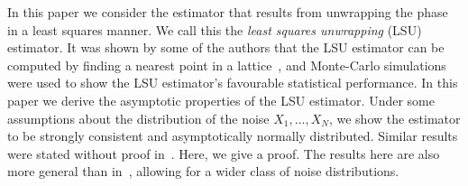 \documentclass[aap,preprint]{imsart}
\begin{document}
In this paper we consider the estimator that results from unwrapping the phase in a least squares manner.  We call this the \emph{least squares unwrapping} (LSU) estimator.  It was shown by some of the authors \cite[Sec. 8.1]{McKilliam2010thesis}\cite{McKilliam2009asilomar_polyest_lattice} that the LSU estimator can be computed by finding a nearest point in a lattice~\cite{Agrell2002}, and Monte-Carlo simulations were used to show the LSU estimator's favourable statistical performance. %
In this paper we derive the asymptotic properties of the LSU estimator.  Under some assumptions about the distribution of the noise $X_1, \dots, X_N$, we show the estimator to be strongly consistent and asymptotically normally distributed.  Similar results were stated without proof in~\cite{McKilliam_polyphase_est_icassp_2011}.  Here, we give a proof.  The results here are also more general than in~\cite{McKilliam_polyphase_est_icassp_2011}, allowing for a wider class of noise distributions.
\end{document}
